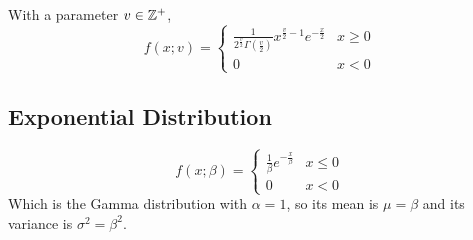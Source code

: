 \documentclass[12pt]{article}
\begin{document}
With a parameter $v \in \mathbb{Z}^+$,
$$f(x;v) = \begin{cases} \frac{1}{2^{\frac{v}{2}}\Gamma\left(\frac{v}{2}\right)}x^{\frac{v}{2}-1}e^{-\frac{x}{2}} & x\geq0 \\ 0 & x<0 \end{cases}$$

\subsection{Exponential Distribution}

$$f(x;\beta) = \begin{cases} \frac{1}{\beta}e^{-\frac{x}{\beta}} & x\leq0 \\ 0 & x<0 \end{cases}$$
Which is the Gamma distribution with $\alpha = 1$, so its mean is $\mu=\beta$ and its variance is $\sigma^2=\beta^2$.
\end{document}
